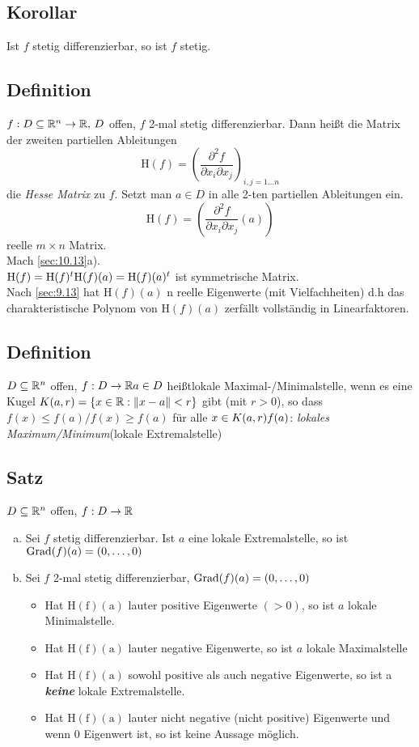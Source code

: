 \subsection{Korollar}\label{sec:\thesubsection}
Ist $f$ stetig differenzierbar, so ist $f$ stetig.
\subsection{Definition}\label{sec:\thesubsection}
$f : D \subseteq \mathbb{R}^n \to \mathbb{R},\, D$ offen, $f$ 2-mal stetig differenzierbar. Dann hei\ss t die Matrix der zweiten partiellen Ableitungen
\[\mathrm{H}(f) = \left( \frac{\partial^2 f}{\partial x_i \partial x_j}  \right)_{i,j = 1\ldots n} \]
die \emph{Hesse Matrix} zu $f$. Setzt man $a \in D$ in alle 2-ten partiellen Ableitungen ein.
\[ \mathrm{H}(f) = \left( \frac{\partial^2 f}{\partial x_i \partial x_j}(a)  \right) \]
reelle $m \times n$ Matrix.\\
Mach \ref{sec:10.13}a).\\
$\mathrm{H}(f) = \mathrm{H}(f)^t\\
\mathrm{H}(f)(a) = \mathrm{H}(f)(a)^t$ ist symmetrische Matrix.\\
Nach \ref{sec:9.13} hat $\mathrm{H}(f)(a)$ n reelle Eigenwerte (mit Vielfachheiten) d.h das charakteristische Polynom von $\mathrm{H}(f)(a)$ zerfällt vollständig in Linearfaktoren.
\subsection{Definition}\label{sec:\thesubsection}
$D \subseteq \mathbb{R}^n$ offen, $f : D \to \mathbb{R}\\
a \in D$ hei\ss tlokale Maximal-/Minimalstelle, wenn es eine Kugel $K(a,r) = \{x \in \mathbb{R} : \Vert x-a\Vert <r \}$ gibt (mit $r > 0$), so dass $f(x) \leq f(a) / f(x) \geq f(a)$ für alle $ x \in K(a,r)\\
f(a)$: \emph{lokales Maximum/Minimum}(lokale Extremalstelle)
\subsection{Satz}\label{sec:\thesubsection}
$D \subseteq \mathbb{R}^n$ offen, $f : D \to \mathbb{R}$
\begin{enumerate}[a)]
\item Sei $f$ stetig differenzierbar. Ist $a$ eine lokale Extremalstelle, so ist $\operatorname{Grad}(f)(a) = (0,\ldots,0)$
\item Sei $f$ 2-mal stetig differenzierbar, $\operatorname{Grad}(f)(a) = (0,\ldots,0)$
\begin{itemize}
\item Hat $\mathrm{H(f)(a)}$ lauter positive Eigenwerte $(> 0)$, so ist $a$ lokale Minimalstelle.
\item Hat $\mathrm{H(f)(a)}$ lauter negative Eigenwerte, so ist $a$ lokale Maximalstelle
\item Hat $\mathrm{H(f)(a)}$ sowohl positive als auch negative Eigenwerte, so ist a \emph{\bf keine} lokale Extremalstelle.
\item Hat $\mathrm{H(f)(a)}$ lauter nicht negative (nicht positive) Eigenwerte und wenn 0 Eigenwert ist, so ist keine Aussage möglich.
\end{itemize}
\end{enumerate}

